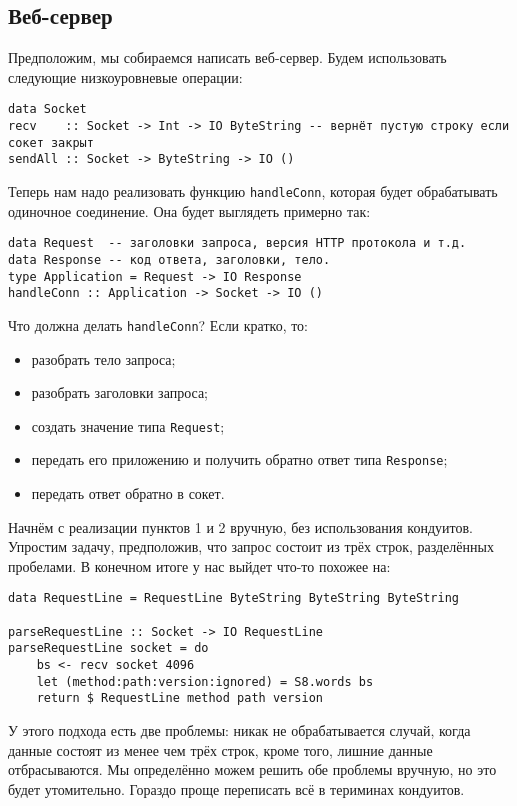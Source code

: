 \subsection{Веб-сервер}
Предположим, мы собираемся написать веб-сервер. Будем использовать следующие низкоуровневые операции:
\begin{lstlisting}
data Socket
recv    :: Socket -> Int -> IO ByteString -- вернёт пустую строку если сокет закрыт
sendAll :: Socket -> ByteString -> IO ()
\end{lstlisting}
Теперь нам надо реализовать функцию \lstinline'handleConn', которая будет обрабатывать 
одиночное соединение. Она будет выглядеть примерно так:
\begin{lstlisting}
data Request  -- заголовки запроса, версия HTTP протокола и т.д.
data Response -- код ответа, заголовки, тело.
type Application = Request -> IO Response
handleConn :: Application -> Socket -> IO ()
\end{lstlisting}
Что должна делать \lstinline'handleConn'? Если кратко, то:
\begin{itemize}  
\item   разобрать тело запроса;
\item   разобрать заголовки запроса;
\item   создать значение типа \lstinline'Request';
\item   передать его приложению и получить обратно ответ типа \lstinline'Response';
\item   передать ответ обратно в сокет.
\end{itemize}  
Начнём с реализации пунктов 1 и 2 вручную, без использования кондуитов. Упростим задачу, предположив, что 
запрос состоит из трёх строк, разделённых пробелами. 
В конечном итоге у нас выйдет что-то похожее на:
\begin{lstlisting}
data RequestLine = RequestLine ByteString ByteString ByteString

parseRequestLine :: Socket -> IO RequestLine
parseRequestLine socket = do
    bs <- recv socket 4096
    let (method:path:version:ignored) = S8.words bs
    return $ RequestLine method path version
\end{lstlisting}
У этого подхода есть две проблемы: никак не обрабатывается случай, когда данные состоят из менее чем 
трёх строк, кроме того, лишние данные отбрасываются. Мы определённо можем решить обе 
проблемы вручную, но это будет утомительно. Гораздо проще переписать всё 
в териминах кондуитов.
